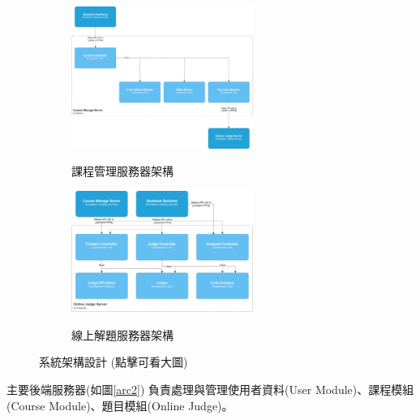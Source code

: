 \documentclass[12pt]{article}
\begin{document}
\begin{enumerate}
\begin{enumerate}
\begin{figure}[htb]
          \bigskip
          \begin{subfigure}{0.45\linewidth}
            \centering
            \href{https://raw.githubusercontent.com/programingtw/proglearn-plan/main/img/arc3.jpg}{
              \includegraphics[width=0.65\textwidth]{./img/arc3.jpg}
            }
            \caption{課程管理服務器架構}
            \label{arc3}
          \end{subfigure}
          \begin{subfigure}{0.45\linewidth}
            \centering
            \href{https://raw.githubusercontent.com/programingtw/proglearn-plan/main/img/arc4.jpg}{
              \includegraphics[width=0.65\textwidth]{./img/arc4.jpg}
            }
            \caption{線上解題服務器架構}
            \label{arc4}            
          \end{subfigure}
          \caption{系統架構設計 (點擊可看大圖)}
        \end{figure}
    
        \par 主要後端服務器(如圖\ref{arc2})
          負責處理與管理使用者資料(User Module)、課程模組(Course Module)、題目模組(Online Judge)。
        

\end{enumerate}
\end{enumerate}
\end{document}
